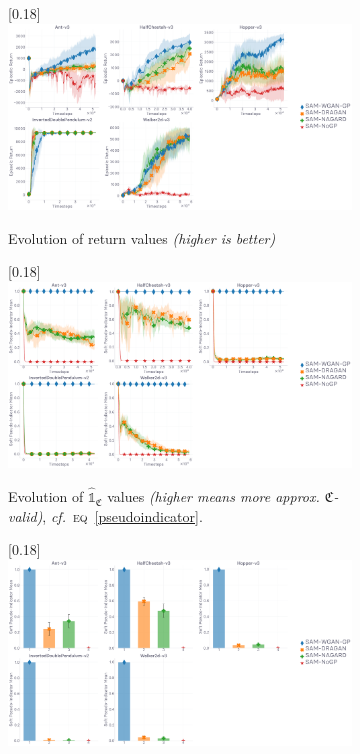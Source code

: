 \begin{figure}
  \center
  \begin{subfigure}[t]{0.99\textwidth}
    \center\scalebox{0.18}[0.18]{\includegraphics{Plots/gs_zeta_5envs/plots_eval_env_ret_plot.pdf}}
    \caption{Evolution of return values \textit{(higher is better)}}
    \label{pseudoindicatorempzetaret}
  \end{subfigure}
  \begin{subfigure}[t]{0.99\textwidth}
    \center\scalebox{0.18}[0.18]{\includegraphics{Plots/gs_zeta_5envs/plots_mod_1_plot.pdf}}
    \caption{Evolution of $\widehat{\mathds{1}}_\mathfrak{C}$ values
    \textit{(higher means more approx. $\mathfrak{C}$-valid)}, \textit{cf.}~\textsc{eq}~\ref{pseudoindicator}.}
  \end{subfigure}
  \begin{subfigure}[t]{0.99\textwidth}
    \center\scalebox{0.18}[0.18]{\includegraphics{Plots/gs_zeta_5envs/plots_mod_1_barplot.pdf}}

\end{subfigure}
\end{figure}
